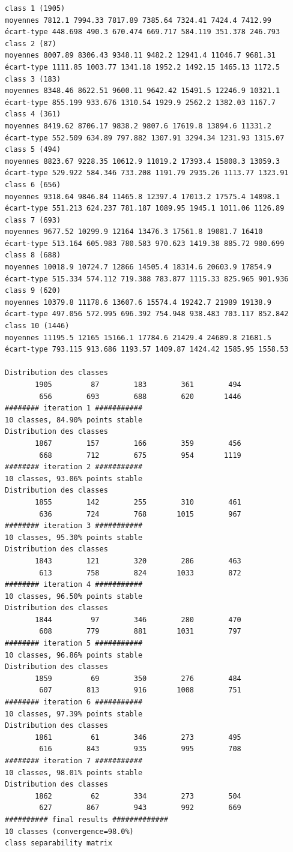 \documentclass[environments,article,submit,pdftex,moreauthors]{Definitions/mdpi}
\begin{document}
\begin{scriptsize}
\begin{verbatim}
class 1 (1905)
moyennes 7812.1 7994.33 7817.89 7385.64 7324.41 7424.4 7412.99
écart-type 448.698 490.3 670.474 669.717 584.119 351.378 246.793
class 2 (87)
moyennes 8007.89 8306.43 9348.11 9482.2 12941.4 11046.7 9681.31
écart-type 1111.85 1003.77 1341.18 1952.2 1492.15 1465.13 1172.5
class 3 (183)
moyennes 8348.46 8622.51 9600.11 9642.42 15491.5 12246.9 10321.1
écart-type 855.199 933.676 1310.54 1929.9 2562.2 1382.03 1167.7
class 4 (361)
moyennes 8419.62 8706.17 9838.2 9807.6 17619.8 13894.6 11331.2
écart-type 552.509 634.89 797.882 1307.91 3294.34 1231.93 1315.07
class 5 (494)
moyennes 8823.67 9228.35 10612.9 11019.2 17393.4 15808.3 13059.3
écart-type 529.922 584.346 733.208 1191.79 2935.26 1113.77 1323.91
class 6 (656)
moyennes 9318.64 9846.84 11465.8 12397.4 17013.2 17575.4 14898.1
écart-type 551.213 624.237 781.187 1089.95 1945.1 1011.06 1126.89
class 7 (693)
moyennes 9677.52 10299.9 12164 13476.3 17561.8 19081.7 16410
écart-type 513.164 605.983 780.583 970.623 1419.38 885.72 980.699
class 8 (688)
moyennes 10018.9 10724.7 12866 14505.4 18314.6 20603.9 17854.9
écart-type 515.334 574.112 719.388 783.877 1115.33 825.965 901.936
class 9 (620)
moyennes 10379.8 11178.6 13607.6 15574.4 19242.7 21989 19138.9
écart-type 497.056 572.995 696.392 754.948 938.483 703.117 852.842
class 10 (1446)
moyennes 11195.5 12165 15166.1 17784.6 21429.4 24689.8 21681.5
écart-type 793.115 913.686 1193.57 1409.87 1424.42 1585.95 1558.53

Distribution des classes
       1905         87        183        361        494
        656        693        688        620       1446
######## iteration 1 ###########
10 classes, 84.90% points stable
Distribution des classes
       1867        157        166        359        456
        668        712        675        954       1119
######## iteration 2 ###########
10 classes, 93.06% points stable
Distribution des classes
       1855        142        255        310        461
        636        724        768       1015        967
######## iteration 3 ###########
10 classes, 95.30% points stable
Distribution des classes
       1843        121        320        286        463
        613        758        824       1033        872
######## iteration 4 ###########
10 classes, 96.50% points stable
Distribution des classes
       1844         97        346        280        470
        608        779        881       1031        797
######## iteration 5 ###########
10 classes, 96.86% points stable
Distribution des classes
       1859         69        350        276        484
        607        813        916       1008        751
######## iteration 6 ###########
10 classes, 97.39% points stable
Distribution des classes
       1861         61        346        273        495
        616        843        935        995        708
######## iteration 7 ###########
10 classes, 98.01% points stable
Distribution des classes
       1862         62        334        273        504
        627        867        943        992        669
########## final results #############
10 classes (convergence=98.0%)
class separability matrix


\end{verbatim}
\end{scriptsize}
\end{document}
